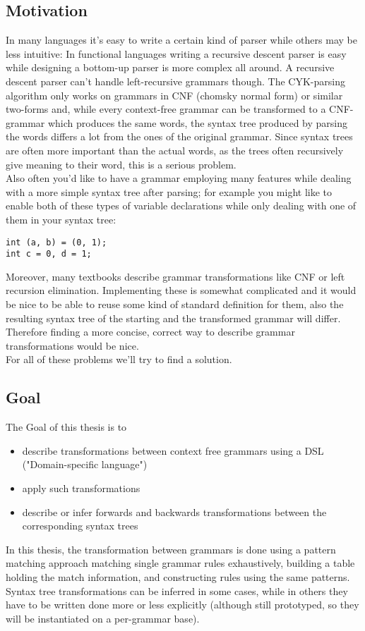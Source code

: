 \documentclass[a4paper]{article}
\begin{document}
\subsection{Motivation}
In many languages it's easy to write a certain kind of parser while others may be less intuitive: In functional languages writing a recursive descent parser is easy while designing a bottom-up parser is more complex all around. A recursive descent parser can't handle left-recursive grammars though. The CYK-parsing algorithm only works on grammars in CNF (chomsky normal form) or similar two-forms \cite{cnfornotcnf} and, while every context-free grammar can be transformed to a CNF-grammar which produces the same words, the syntax tree produced by parsing the words differs a lot from the ones of the original grammar. Since syntax trees are often more important than the actual words, as the trees often recursively give meaning to their word, this is a serious problem.\\
Also often you'd like to have a grammar employing many features while dealing with a more simple syntax tree after parsing; for example you might like to enable both of these types of variable declarations while only dealing with one of them in your syntax tree:
\begin{verbatim}
int (a, b) = (0, 1);
int c = 0, d = 1;
\end{verbatim}
Moreover, many textbooks describe grammar transformations like CNF or left recursion elimination. Implementing these is somewhat complicated and it would be nice to be able to reuse some kind of standard definition for them, also the resulting syntax tree of the starting and the transformed grammar will differ. Therefore finding a more concise, correct way to describe grammar transformations would be nice.\\
For all of these problems we'll try to find a solution.
\subsection{Goal}
The Goal of this thesis is to
\begin{itemize}
\item describe transformations between context free grammars using a DSL ("Domain-specific language")
\item apply such transformations
\item describe or infer forwards and backwards transformations between the corresponding syntax trees
\end{itemize}
In this thesis, the transformation between grammars is done using a pattern matching approach matching single grammar rules exhaustively, building a table holding the match information, and constructing rules using the same patterns. Syntax tree transformations can be inferred in some cases, while in others they have to be written done more or less explicitly (although still prototyped, so they will be instantiated on a per-grammar base).
\end{document}

